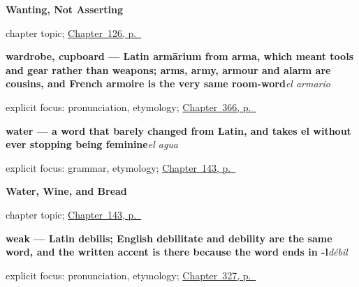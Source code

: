 \noindent\begin{minipage}[t]{\linewidth}
\raggedright
\textbf{Wanting, Not Asserting}\par
\footnotesize chapter topic; \hyperref[ch:spanish-quiero-que]{Chapter~126, p.~\pageref*{ch:spanish-quiero-que}}
\end{minipage}\par\smallskip

\noindent\begin{minipage}[t]{\linewidth}
\raggedright
\textbf{wardrobe, cupboard — Latin armārium from arma, which meant tools and gear rather than weapons; arms, army, armour and alarm are cousins, and French armoire is the very same room-word}\enspace\emph{el armario}\par
\footnotesize explicit focus: pronunciation, etymology; \hyperref[ch:la-caja-y-la-lampara]{Chapter~366, p.~\pageref*{ch:la-caja-y-la-lampara}}
\end{minipage}\par\smallskip

\noindent\begin{minipage}[t]{\linewidth}
\raggedright
\textbf{water — a word that barely changed from Latin, and takes el without ever stopping being feminine}\enspace\emph{el agua}\par
\footnotesize explicit focus: grammar, etymology; \hyperref[ch:spanish-water-wine-bread]{Chapter~143, p.~\pageref*{ch:spanish-water-wine-bread}}
\end{minipage}\par\smallskip

\noindent\begin{minipage}[t]{\linewidth}
\raggedright
\textbf{Water, Wine, and Bread}\par
\footnotesize chapter topic; \hyperref[ch:spanish-water-wine-bread]{Chapter~143, p.~\pageref*{ch:spanish-water-wine-bread}}
\end{minipage}\par\smallskip

\noindent\begin{minipage}[t]{\linewidth}
\raggedright
\textbf{weak — Latin debilis; English debilitate and debility are the same word, and the written accent is there because the word ends in -l}\enspace\emph{débil}\par
\footnotesize explicit focus: pronunciation, etymology; \hyperref[ch:despierto-y-sano]{Chapter~327, p.~\pageref*{ch:despierto-y-sano}}
\end{minipage}\par\smallskip

